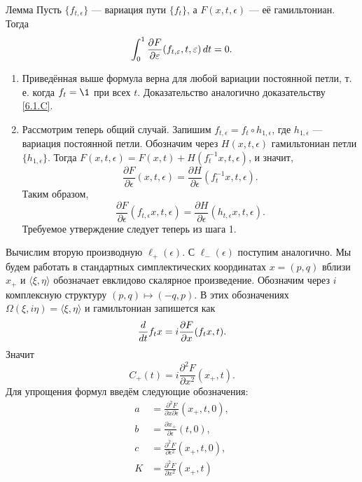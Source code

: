 \begin{thm}{Лемма}\label{12.4.B}
Пусть $\{f_{t,\epsilon}\}$ — вариация пути $\{f_t\}$, а $F(x, t,\epsilon)$ — её гамильтониан.
Тогда 
\[\int_0^1\frac{\partial F}{\partial \varepsilon}(f_{t,\varepsilon},t,\varepsilon)\,d t=0.\] 

\end{thm}

\begin{enumerate}[1)]
\item Приведённая выше формула верна для любой вариации постоянной петли, т. е. когда $f_t = \1$ при всех $t$.
Доказательство аналогично доказательству \ref{6.1.C}.
\item Рассмотрим теперь общий случай.
Запишим $f_{t,\epsilon} = f_t \circ h_{1,\epsilon}$, где $h_{1,\epsilon}$ — вариация постоянной петли.
Обозначим через $H(x, t, \epsilon)$ гамильтониан петли $\{h_{1,\epsilon}\}$.
Тогда $F(x,t,\epsilon) = F(x,t) + H(f_t^{-1}x,t,\epsilon)$, и значит, 
\[\frac{\partial F}{\partial \epsilon}(x,t,\epsilon)=\frac{\partial H}{\partial \epsilon}(f_t^{-1}x,t,\epsilon).\]
Таким образом,
\[\frac{\partial F}{\partial \epsilon}(f_{t,\epsilon}x,t,\epsilon)=\frac{\partial H}{\partial \epsilon}(h_{t,\epsilon}x,t,\epsilon).\]
Требуемое утверждение следует теперь из шага 1.
\end{enumerate}
\qeds

Вычислим вторую производную $\ell_+(\epsilon)$.
С $\ell_-(\epsilon)$ поступим аналогично.
Мы будем работать в стандартных симплектических координатах $x = (p, q)$ вблизи $x_+$ и $\langle\xi,\eta\rangle$ обозначает евклидово скалярное произведение.
Обозначим через $i$ комплексную структуру $(p, q) \mapsto (-q, p)$.
В этих обозначениях $\Omega(\xi, i\eta) = \langle\xi,\eta\rangle$ и гамильтониан запишется как
\[\frac{d}{d t}f_tx=i\frac{\partial F}{\partial x}(f_tx,t).\]
Значит
\[C_+(t)=i\frac{\partial^2F}{\partial x^2}(x_+,t).\]
Для упрощения формул введём следующие обозначения: 
\begin{align*}
a&=\frac{\partial^2 F}{\partial x\partial\epsilon}(x_+,t,0),
\\
b&=\frac{\partial x_+}{\partial\epsilon}(t,0),
\\
c&=\frac{\partial^2 F}{\partial\epsilon^2}(x_+,t,0),
\\
K&=\frac{\partial^2 F}{\partial x^2}(x_+,t)
\end{align*}

